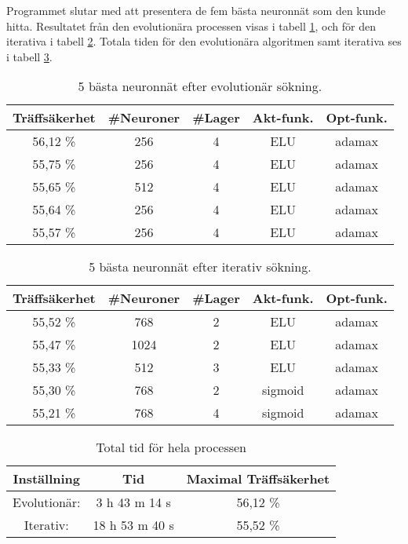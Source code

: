 \documentclass[a4paper, 12pt]{article}
\begin{document}
  Programmet slutar med att presentera de fem bästa neuronnät som den kunde hitta. Resultatet från den evolutionära processen visas i tabell \ref{evo}, och för den iterativa i tabell \ref{iterativ}. Totala tiden för den evolutionära algoritmen samt iterativa ses i tabell \ref{total}.

\begin{table}[H]
    \centering
    \begin{tabular}{c|c|c|c|c}
      Träffsäkerhet & \#Neuroner & \#Lager & Akt-funk. & Opt-funk. \\
      \hline
      56,12 \% & 256 & 4 & ELU & adamax \\
      55,75 \% & 256 & 4 & ELU & adamax \\
      55,65 \% & 512 & 4 & ELU & adamax \\
      55,64 \% & 256 & 4 & ELU & adamax \\
      55,57 \% & 256 & 4 & ELU & adamax \\
    \end{tabular}
    \caption{5 bästa neuronnät efter evolutionär sökning.}
    \label{evo}
\end{table}

\begin{table}[H]
    \centering
    \begin{tabular}{c|c|c|c|c}
        Träffsäkerhet & \#Neuroner & \#Lager & Akt-funk. & Opt-funk. \\
        \hline
        55,52 \% & 768 & 2 & ELU & adamax \\
        55,47 \% & 1024 & 2 & ELU & adamax \\
        55,33 \% & 512 & 3 & ELU & adamax \\
        55,30 \% & 768 & 2 & sigmoid & adamax \\
        55,21 \% & 768 & 4 & sigmoid & adamax \\
    \end{tabular}
    \caption{5 bästa neuronnät efter iterativ sökning.}
    \label{iterativ}
\end{table}

\begin{table}[H]
    \centering
    \begin{tabular}{c|c|c}
      Inställning & Tid & Maximal Träffsäkerhet\\
      \hline
      Evolutionär: & 3 h 43 m 14 s & 56,12 \% \\
      Iterativ: & 18 h 53 m 40 s & 55,52 \% \\
    \end{tabular}
    \caption{Total tid för hela processen}
    \label{total}
\end{table}
\end{document}
